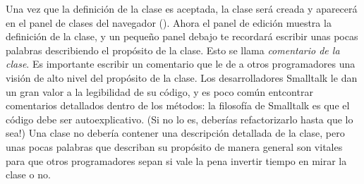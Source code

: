 \documentclass[a4paper,10pt,twoside]{book}
\begin{document}

Una vez que la definición de la clase es aceptada, la clase será creada y aparecerá en el panel de clases del navegador ().
Ahora el panel de edición muestra la definición de la clase, y un pequeño panel debajo te recordará escribir unas pocas palabras describiendo el propósito de la clase. Esto se llama \emph {comentario de la clase}. Es importante escribir un comentario que le de a otros programadores una visión de alto nivel del propósito de la clase.
Los desarrolladores Smalltalk le dan un gran valor a la legibilidad de su código, y es poco común entcontrar comentarios detallados dentro de los métodos: la filosofía de Smalltalk es que el código debe ser autoexplicativo. (Si no lo es, deberías refactorizarlo hasta que lo sea!) Una clase  no debería contener una descripción detallada de la clase, pero unas pocas palabras que describan su propósito de manera general son vitales para que otros programadores sepan si vale la pena invertir tiempo en mirar la clase o no.

\end{document}
